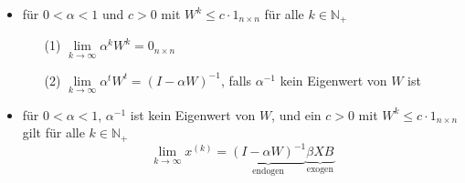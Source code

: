 \begin{itemize}
	\item für $0<\alpha<1$ und $c>0$ mit $W^k\leq c\cdot 1_{n\times n}$ für alle $k\in\mathbb{N}_+$
		\begin{enumerate}
			\item[(1)] $\lim\limits_{k\rightarrow\infty}\alpha^kW^k = 0_{n\times n}$
			\item[(2)] $\lim\limits_{k\rightarrow\infty}\alpha^tW^t = (I-\alpha W)^{-1}$, falls $\alpha^{-1}$ kein Eigenwert von $W$ ist
		\end{enumerate}
	\item für $0<\alpha <1$, $\alpha^{-1}$ ist kein Eigenwert von $W$, und ein $c>0$ mit $W^k\leq c\cdot 1_{n\times n}$ gilt für alle $k\in\mathbb{N}_+$
		\[\lim_{k\rightarrow\infty}x^{(k)}=\underbrace{(I-\alpha W)^{-1}}_{\text{endogen}}\underbrace{\beta XB}_{\text{exogen}}\]
\end{itemize}